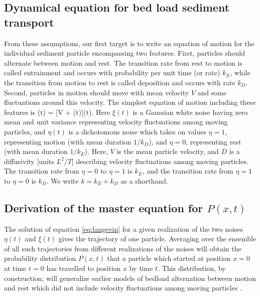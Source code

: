 \subsection{Dynamical equation for bed load sediment transport}
From these assumptions, our first target is to write an equation of motion for the individual sediment particle encompassing two features. First, particles should alternate between motion and rest. The transition rate from rest to motion is called entrainment and occurs with probability per unit time (or rate) $k_E$, while the transition from motion to rest is called deposition and occurs with rate $k_D$. Second, particles in motion should move with mean velocity $V$ and some fluctuations around this velocity. 
The simplest equation of motion including these features is
\be {}(t) = [V + \xi(t)]\eta(t).  \label{eq:langevin} \ee
Here $\xi(t)$ is a Gaussian white noise having zero mean and unit variance representing velocity fluctuations among moving particles, and $\eta(t)$ is a dichotomous noise which takes on values $\eta = 1$, representing motion (with mean duration $1/k_D$), and $\eta=0$, representing rest (with mean duration $1/k_E$). Here, $V$ is the mean particle velocity, and $D$ is a diffusivity [units $L^2/T$] describing velocity fluctuations among moving particles. The transition rate from $\eta=0$ to $\eta = 1$ is $k_E$, and the transition rate from $\eta=1$ to $\eta= 0$ is $k_D$. We write $k=k_E+k_D$ as a shorthand. 

\subsection{Derivation of the master equation for $P(x,t)$}
The solution of equation \ref{eq:langevin} for a given realization of the two noises $\eta(t)$ and $\xi(t)$ gives the trajectory of one particle. Averaging over the ensemble of all such trajectories from different realizations of the noises will obtain the probability distribution $P(x,t)$ that a particle which started at position $x=0$ at time $t=0$ has travelled to position $x$ by time $t$. This distribution, by construction, will generalize earlier models of bedload alternation between motion and rest which did not include velocity fluctuations among moving particles \citep{Lisle1998,Lajeunesse2017}.

